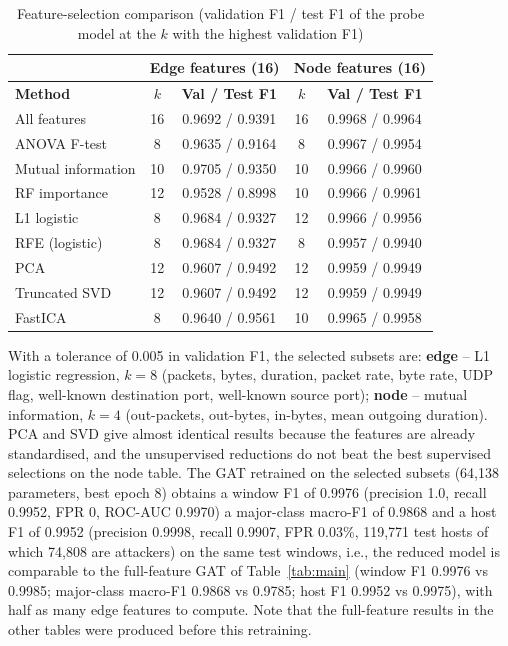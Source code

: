 \begin{table}[htbp]
\centering
\caption{Feature-selection comparison (validation F1 / test F1 of the probe model at the $k$ with the highest validation F1)}
\label{tab:featsel}
\small
\begin{tabular}{|l|c|c|c|c|}
\hline
 & \multicolumn{2}{c|}{\textbf{Edge features (16)}} & \multicolumn{2}{c|}{\textbf{Node features (16)}} \\ \hline
\textbf{Method} & \textbf{$k$} & \textbf{Val / Test F1} & \textbf{$k$} & \textbf{Val / Test F1} \\ \hline
All features & 16 & 0.9692 / 0.9391 & 16 & 0.9968 / 0.9964 \\ \hline
ANOVA F-test & 8 & 0.9635 / 0.9164 & 8 & 0.9967 / 0.9954 \\ \hline
Mutual information & 10 & 0.9705 / 0.9350 & 10 & 0.9966 / 0.9960 \\ \hline
RF importance & 12 & 0.9528 / 0.8998 & 10 & 0.9966 / 0.9961 \\ \hline
L1 logistic & 8 & 0.9684 / 0.9327 & 12 & 0.9966 / 0.9956 \\ \hline
RFE (logistic) & 8 & 0.9684 / 0.9327 & 8 & 0.9957 / 0.9940 \\ \hline
PCA & 12 & 0.9607 / 0.9492 & 12 & 0.9959 / 0.9949 \\ \hline
Truncated SVD & 12 & 0.9607 / 0.9492 & 12 & 0.9959 / 0.9949 \\ \hline
FastICA & 8 & 0.9640 / 0.9561 & 10 & 0.9965 / 0.9958 \\ \hline
\end{tabular}
\end{table}

With a tolerance of 0.005 in validation F1, the selected subsets are: \textbf{edge} -- L1 logistic regression, $k=8$ (packets, bytes, duration, packet rate, byte rate, UDP flag, well-known destination port, well-known source port); \textbf{node} -- mutual information, $k=4$ (out-packets, out-bytes, in-bytes, mean outgoing duration). PCA and SVD give almost identical results because the features are already standardised, and the unsupervised reductions do not beat the best supervised selections on the node table. The GAT retrained on the selected subsets (64,138 parameters, best epoch 8) obtains a window F1 of 0.9976 (precision 1.0, recall 0.9952, FPR 0, ROC-AUC 0.9970) a major-class macro-F1 of 0.9868 and a host F1 of 0.9952 (precision 0.9998, recall 0.9907, FPR 0.03\%, 119,771 test hosts of which 74,808 are attackers) on the same test windows, i.e., the reduced model is comparable to the full-feature GAT of Table~\ref{tab:main} (window F1 0.9976 vs 0.9985; major-class macro-F1 0.9868 vs 0.9785; host F1 0.9952 vs 0.9975), with half as many edge features to compute. Note that the full-feature results in the other tables were produced before this retraining.

